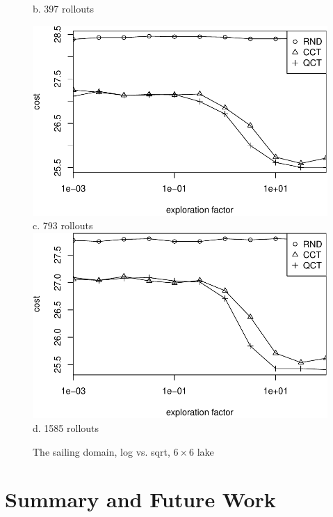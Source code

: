 \documentclass{article}
\begin{document}
\begin{figure}[t]
\begin{minipage}[b]{0.5\linewidth}
    b. 397 rollouts\\
  \end{minipage}
  \begin{minipage}[b]{0.5\linewidth}
    \centering
    \includegraphics[scale=0.45]{rcq-size=6-nsamples=793.pdf}\\
    c. 793 rollouts\\
    \vspace{1em}
    \includegraphics[scale=0.45]{rcq-size=6-nsamples=1585.pdf}\\
    d. 1585 rollouts\\
  \end{minipage}
  \caption{The sailing domain, log vs. sqrt, $6\times 6$ lake}
  \label{fig:sailing-rcq-vs-factor}
\end{figure}

\section{Summary and Future Work}
\end{document}
